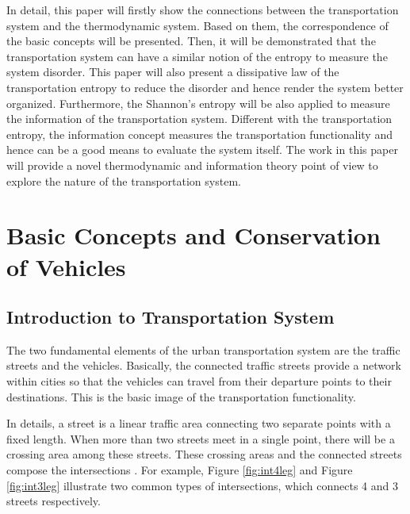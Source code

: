 \documentclass[preprint,authoryear,12pt]{elsarticle}
\begin{document}
In detail, this paper will firstly show the connections between the transportation system and the thermodynamic system. Based on them, the correspondence of the basic concepts will be presented. Then, it will be demonstrated that the transportation system can have a similar notion of the entropy to measure the system disorder. This paper will also present a dissipative law of the transportation entropy to reduce the disorder and hence render the system better organized. Furthermore, the Shannon's entropy will be also applied to measure the information of the transportation system. Different with the transportation entropy, the information concept measures the transportation functionality and hence can be a good means to evaluate the system itself. The work in this paper will provide a novel thermodynamic and information theory point of view to explore the nature of the transportation system.

\section{Basic Concepts and Conservation of Vehicles}

\subsection{Introduction to Transportation System}

The two fundamental elements of the urban transportation system are the traffic streets and the vehicles. Basically, the connected traffic streets provide a network within cities so that the vehicles can travel from their departure points to their destinations. This is the basic image of the transportation functionality.

In details, a street is a linear traffic area connecting two separate points with a fixed length. When more than two streets meet in a single point, there will be a crossing area among these streets. These crossing areas and the connected streets compose the intersections \citep{papageorgiou_review_2003}. For example, Figure \ref{fig:int4leg} and Figure \ref{fig:int3leg} illustrate two common types of intersections, which connects 4 and 3 streets respectively.
\end{document}

